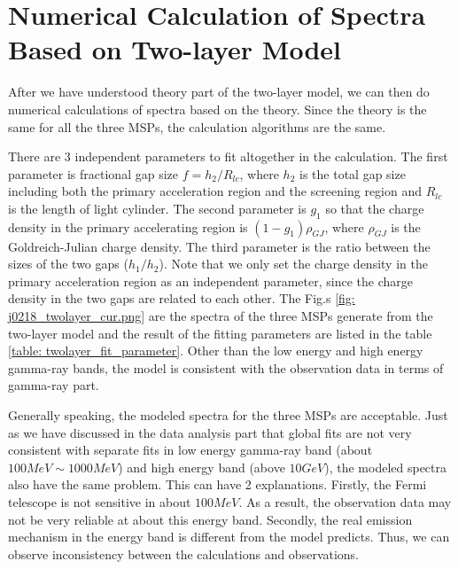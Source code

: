 \documentclass[12pt]{report}
\begin{document}
        \section{Numerical Calculation of Spectra Based on Two-layer Model}
          After we have understood theory part of the two-layer model, we can then do numerical 
          calculations of spectra 
          based on the theory. Since the theory is the same for all the three MSPs, the calculation 
          algorithms are the same. 

          There are 3 independent parameters to fit altogether in the calculation. 
          The first parameter is fractional gap size $f=h_{2}/R_{lc}$, where $h_{2}$ is the 
          total gap size including both the primary acceleration region and the screening region 
          and $R_{lc}$ is the length of light cylinder. The second parameter is $g_{1}$ so that
          the charge density in the primary accelerating region is $\left(1-g_{1}\right) \rho_{GJ}$, 
          where $\rho_{GJ}$ is the Goldreich-Julian charge density. The third parameter is the ratio 
          between the sizes of the two gaps ($h_{1}/h_{2}$). Note that we only set the charge density in the primary acceleration region as an 
          independent parameter, since the charge density in the two gaps are related to each 
          other. The Fig.s \ref{fig: j0218_twolayer_cur.png} are the spectra of the three MSPs generate 
          from the two-layer model and the result of the fitting parameters are listed in the table 
          \ref{table: twolayer_fit_parameter}. Other than the low energy and high energy gamma-ray bands, 
          the model is consistent with the observation data in terms of gamma-ray part. 

          Generally speaking, the modeled spectra for the three MSPs are acceptable. Just as 
          we have discussed in the data analysis part that global fits are not very consistent 
          with separate fits in low energy gamma-ray band (about $100MeV\sim 1000MeV$) and high energy
          band (above $10GeV$), the modeled spectra also have the same problem. 
          This can have 2 explanations. Firstly, the Fermi telescope is not sensitive in about $100 MeV$.
          As a result, the observation data may not be very reliable at about this energy band. Secondly, the  
          real emission mechanism in the energy band is different from the model predicts. Thus, we can observe 
          inconsistency between the calculations and observations.
 
\end{document}
